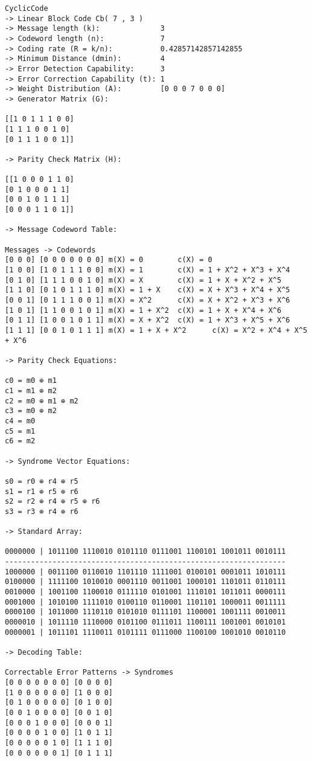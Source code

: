 \begin{lstlisting}
CyclicCode
-> Linear Block Code Cb( 7 , 3 )
-> Message length (k):              3
-> Codeword length (n):             7
-> Coding rate (R = k/n):           0.42857142857142855
-> Minimum Distance (dmin):         4
-> Error Detection Capability:      3
-> Error Correction Capability (t): 1
-> Weight Distribution (A):         [0 0 0 7 0 0 0]
-> Generator Matrix (G):

[[1 0 1 1 1 0 0]
[1 1 1 0 0 1 0]
[0 1 1 1 0 0 1]]

-> Parity Check Matrix (H):

[[1 0 0 0 1 1 0]
[0 1 0 0 0 1 1]
[0 0 1 0 1 1 1]
[0 0 0 1 1 0 1]]

-> Message Codeword Table:

Messages -> Codewords
[0 0 0] [0 0 0 0 0 0 0] m(X) = 0        c(X) = 0
[1 0 0] [1 0 1 1 1 0 0] m(X) = 1        c(X) = 1 + X^2 + X^3 + X^4
[0 1 0] [1 1 1 0 0 1 0] m(X) = X        c(X) = 1 + X + X^2 + X^5
[1 1 0] [0 1 0 1 1 1 0] m(X) = 1 + X    c(X) = X + X^3 + X^4 + X^5
[0 0 1] [0 1 1 1 0 0 1] m(X) = X^2      c(X) = X + X^2 + X^3 + X^6
[1 0 1] [1 1 0 0 1 0 1] m(X) = 1 + X^2  c(X) = 1 + X + X^4 + X^6
[0 1 1] [1 0 0 1 0 1 1] m(X) = X + X^2  c(X) = 1 + X^3 + X^5 + X^6
[1 1 1] [0 0 1 0 1 1 1] m(X) = 1 + X + X^2      c(X) = X^2 + X^4 + X^5 + X^6

-> Parity Check Equations:

c0 = m0 ⊕ m1
c1 = m1 ⊕ m2
c2 = m0 ⊕ m1 ⊕ m2
c3 = m0 ⊕ m2
c4 = m0
c5 = m1
c6 = m2

-> Syndrome Vector Equations:

s0 = r0 ⊕ r4 ⊕ r5
s1 = r1 ⊕ r5 ⊕ r6
s2 = r2 ⊕ r4 ⊕ r5 ⊕ r6
s3 = r3 ⊕ r4 ⊕ r6

-> Standard Array:

0000000 | 1011100 1110010 0101110 0111001 1100101 1001011 0010111 
-----------------------------------------------------------------
1000000 | 0011100 0110010 1101110 1111001 0100101 0001011 1010111 
0100000 | 1111100 1010010 0001110 0011001 1000101 1101011 0110111 
0010000 | 1001100 1100010 0111110 0101001 1110101 1011011 0000111 
0001000 | 1010100 1111010 0100110 0110001 1101101 1000011 0011111 
0000100 | 1011000 1110110 0101010 0111101 1100001 1001111 0010011 
0000010 | 1011110 1110000 0101100 0111011 1100111 1001001 0010101 
0000001 | 1011101 1110011 0101111 0111000 1100100 1001010 0010110 

-> Decoding Table:

Correctable Error Patterns -> Syndromes
[0 0 0 0 0 0 0] [0 0 0 0]
[1 0 0 0 0 0 0] [1 0 0 0]
[0 1 0 0 0 0 0] [0 1 0 0]
[0 0 1 0 0 0 0] [0 0 1 0]
[0 0 0 1 0 0 0] [0 0 0 1]
[0 0 0 0 1 0 0] [1 0 1 1]
[0 0 0 0 0 1 0] [1 1 1 0]
[0 0 0 0 0 0 1] [0 1 1 1]
\end{lstlisting}


